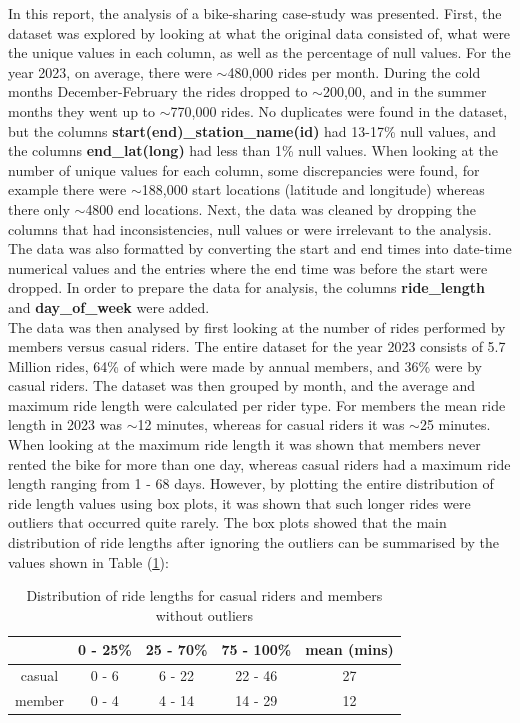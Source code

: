 \documentclass[12pt]{article}
\begin{document}
In this report, the analysis of a bike-sharing case-study was presented. First, the dataset was explored by looking at   what the original data consisted of, what were the unique values in each column, as well as the percentage of null values. For the year 2023, on average, there were $\sim$480,000 rides per month. During the cold months December-February the rides dropped to $\sim$200,00, and in the summer months they went up to $\sim$770,000 rides. No duplicates were found in the dataset, but the columns \textbf{start(end)\_station\_name(id)} had 13-17\% null values, and the columns \textbf{end\_lat(long)} had less than 1\% null values. When looking at the number of unique values for each column, some discrepancies were found, for example there were $\sim$188,000 start locations (latitude and longitude) whereas there only $\sim$4800 end locations. Next, the data was cleaned by dropping the columns that had inconsistencies, null values or were irrelevant to the analysis. The data was also formatted by converting the start and end times into date-time numerical values and the entries where the end time was before the start were dropped. In order to prepare the data for analysis, the columns \textbf{ride\_length} and \textbf{day\_of\_week} were added. \\

The data was then analysed by first looking at the number of rides performed by members versus casual riders. The entire dataset for the year 2023 consists of 5.7 Million rides, 64\% of which were made by annual members, and 36\% were by casual riders. The dataset was then grouped by month, and the average and maximum ride length were calculated per rider type. For members the mean ride length in 2023 was $\sim$12 minutes, whereas for casual riders it was $\sim$25 minutes. When looking at the maximum ride length it was shown that members never rented the bike for more than one day, whereas casual riders had a maximum ride length ranging from 1 - 68 days. However, by plotting the entire distribution of ride length values using box plots, it was shown that such longer rides were outliers that occurred quite rarely. The box plots showed that the main distribution of ride lengths after ignoring the outliers can be summarised by the values shown in Table (\underline{\ref{table1}}): 

\begin{table}[h]
\begin{center}
\begin{tabular}{ | c | c | c| c | c |  } 
\hline
   	& 0 - 25\% 	& 25 - 70\% 	& 75 - 100\% &  mean (mins)  \\ 
  \hline
casual 	& 0 - 6 		&  6 - 22 		& 22 - 46 & 27 \\
\hline
member 	& 0 - 4 		& 4 - 14		& 14 - 29 & 12 \\
\hline
\end{tabular}
\caption{Distribution of ride lengths for casual riders and members without outliers}
\label{table1}
\end{center} 
\end{table}
\end{document}
